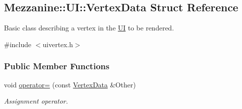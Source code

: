 \hypertarget{structMezzanine_1_1UI_1_1VertexData}{
\subsection{Mezzanine::UI::VertexData Struct Reference}
\label{structMezzanine_1_1UI_1_1VertexData}
}


Basic class describing a vertex in the \hyperlink{namespaceMezzanine_1_1UI}{UI} to be rendered.  




{\ttfamily \#include $<$uivertex.h$>$}

\subsubsection*{Public Member Functions}
\begin{DoxyCompactItemize}
\item 
\hypertarget{structMezzanine_1_1UI_1_1VertexData_a9a3939124d43f233bf7a73b4794d7709}{
void \hyperlink{structMezzanine_1_1UI_1_1VertexData_a9a3939124d43f233bf7a73b4794d7709}{operator=} (const \hyperlink{structMezzanine_1_1UI_1_1VertexData}{VertexData} \&Other)}
\label{structMezzanine_1_1UI_1_1VertexData_a9a3939124d43f233bf7a73b4794d7709}

\begin{DoxyCompactList}\small\item\em Assignment operator. \item\end{DoxyCompactList}\end{DoxyCompactItemize}
